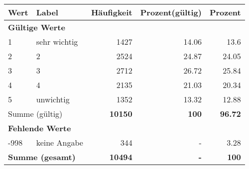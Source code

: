      \begin{longtable}{lXrrr}
     \toprule
     \textbf{Wert} & \textbf{Label} & \textbf{Häufigkeit} & \textbf{Prozent(gültig)} & \textbf{Prozent} \\
     \endhead
     \midrule
     \multicolumn{5}{l}{\textbf{Gültige Werte}}\\

     1 &
     \multicolumn{1}{X}{ sehr wichtig   } &


       \num{1427} &
       \num[round-mode=places,round-precision=2]{14.06} &
         \num[round-mode=places,round-precision=2]{13.6} \\

     2 &
     \multicolumn{1}{X}{ 2   } &


       \num{2524} &
       \num[round-mode=places,round-precision=2]{24.87} &
         \num[round-mode=places,round-precision=2]{24.05} \\

     3 &
     \multicolumn{1}{X}{ 3   } &


       \num{2712} &
       \num[round-mode=places,round-precision=2]{26.72} &
         \num[round-mode=places,round-precision=2]{25.84} \\

     4 &
     \multicolumn{1}{X}{ 4   } &


       \num{2135} &
       \num[round-mode=places,round-precision=2]{21.03} &
         \num[round-mode=places,round-precision=2]{20.34} \\

     5 &
     \multicolumn{1}{X}{ unwichtig   } &


       \num{1352} &
       \num[round-mode=places,round-precision=2]{13.32} &
         \num[round-mode=places,round-precision=2]{12.88} \\
     \midrule
     \multicolumn{2}{l}{Summe (gültig)} &
       \textbf{\num{10150}} &
     \textbf{\num{100}} &
       \textbf{\num[round-mode=places,round-precision=2]{96.72}} \\
     \multicolumn{5}{l}{\textbf{Fehlende Werte}}\\
       -998 &
       keine Angabe &
         \num{344} &
        - &
         \num[round-mode=places,round-precision=2]{3.28} \\
     \midrule
     \multicolumn{2}{l}{\textbf{Summe (gesamt)}} &
          \textbf{\num{10494}} &
        \textbf{-} &
        \textbf{\num{100}} \\
     \bottomrule
     \end{longtable}
     
